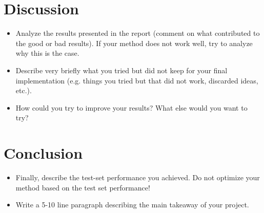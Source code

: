 \documentclass[a4, 10 pt, conference]{ieeeconf}  %
\begin{document}
\section{Discussion}
\label{sec:discuss}

{\color{blue}
  \begin{itemize}
    \item Analyze the results presented in the report (comment on what contributed to the good or bad results). If your method does not work well, try to analyze why this is the case.
    \item Describe very briefly what you tried but did not keep for your final implementation (e.g. things you tried but that did not work, discarded ideas, etc.).
    \item How could you try to improve your results? What else would you want to try?

  \end{itemize}
}

\section{Conclusion}
\label{sec:con}

{\color{blue}

  \begin{itemize}
    \item Finally, describe the test-set performance you achieved. Do not
          optimize your method based on the test set performance!
    \item Write a 5-10 line paragraph describing the main takeaway of your project.
  \end{itemize}

}

\end{document}
